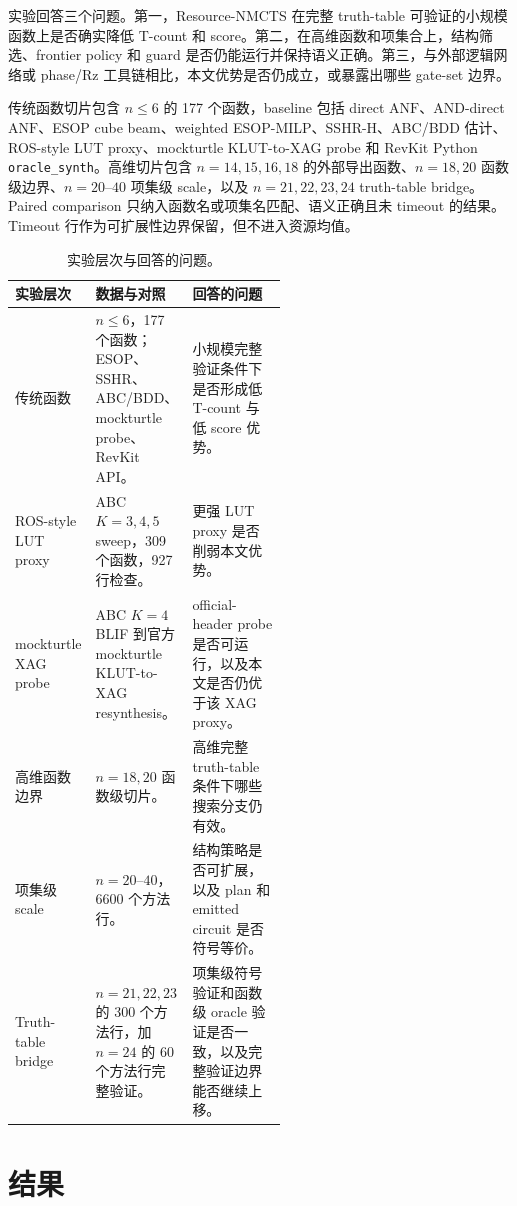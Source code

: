 \documentclass[UTF8,fontset=macnew,11pt]{ctexart}
\newcommand{\method}{Resource-NMCTS}
\newcommand{\anf}{\ensuremath{\mathrm{ANF}}}
\begin{document}
实验回答三个问题。第一，\method{} 在完整 truth-table 可验证的小规模函数上是否确实降低 T-count 和 score。第二，在高维函数和项集合上，结构筛选、frontier policy 和 guard 是否仍能运行并保持语义正确。第三，与外部逻辑网络或 phase/Rz 工具链相比，本文优势是否仍成立，或暴露出哪些 gate-set 边界。

传统函数切片包含 $n\leq6$ 的 177 个函数，baseline 包括 direct \anf{}、AND-direct \anf{}、ESOP cube beam、weighted ESOP-MILP、SSHR-H、ABC/BDD 估计、ROS-style LUT proxy、mockturtle KLUT-to-XAG probe 和 RevKit Python \texttt{oracle\_synth}。高维切片包含 $n=14,15,16,18$ 的外部导出函数、$n=18,20$ 函数级边界、$n=20$--$40$ 项集级 scale，以及 $n=21,22,23,24$ truth-table bridge。Paired comparison 只纳入函数名或项集名匹配、语义正确且未 timeout 的结果。Timeout 行作为可扩展性边界保留，但不进入资源均值。

\begin{table}[H]
\centering
\scriptsize
\caption{实验层次与回答的问题。}
\label{tab:experiment-layers}
\begin{tabularx}{\linewidth}{>{\raggedright\arraybackslash}p{0.23\linewidth}>{\raggedright\arraybackslash}p{0.31\linewidth}>{\raggedright\arraybackslash}X}
\toprule
实验层次 & 数据与对照 & 回答的问题 \\
\midrule
传统函数 & $n\leq6$，177 个函数；ESOP、SSHR、ABC/BDD、mockturtle probe、RevKit API。 & 小规模完整验证条件下是否形成低 T-count 与低 score 优势。 \\
ROS-style LUT proxy & ABC $K=3,4,5$ sweep，309 个函数，927 行检查。 & 更强 LUT proxy 是否削弱本文优势。 \\
mockturtle XAG probe & ABC $K=4$ BLIF 到官方 mockturtle KLUT-to-XAG resynthesis。 & official-header probe 是否可运行，以及本文是否仍优于该 XAG proxy。 \\
高维函数边界 & $n=18,20$ 函数级切片。 & 高维完整 truth-table 条件下哪些搜索分支仍有效。 \\
项集级 scale & $n=20$--$40$，6600 个方法行。 & 结构策略是否可扩展，以及 plan 和 emitted circuit 是否符号等价。 \\
Truth-table bridge & $n=21,22,23$ 的 300 个方法行，加 $n=24$ 的 60 个方法行完整验证。 & 项集级符号验证和函数级 oracle 验证是否一致，以及完整验证边界能否继续上移。 \\
\bottomrule
\end{tabularx}
\end{table}

\section{结果}
\end{document}
